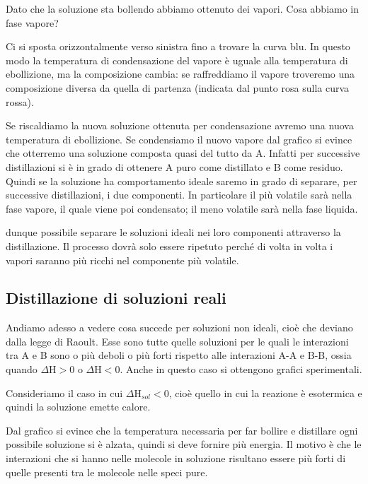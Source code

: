 Dato che la soluzione sta bollendo abbiamo ottenuto dei vapori. Cosa abbiamo in fase vapore?

Ci si sposta orizzontalmente verso sinistra fino a trovare la curva blu. In questo modo la temperatura di condensazione del vapore è uguale alla temperatura di ebollizione, ma la composizione cambia: se raffreddiamo il vapore troveremo una composizione diversa da quella di partenza (indicata dal punto rosa sulla curva rossa).

Se riscaldiamo la nuova soluzione ottenuta per condensazione avremo una nuova temperatura di ebollizione. Se condensiamo il nuovo vapore dal grafico si evince che otterremo una soluzione composta quasi del tutto da A. Infatti per successive distillazioni si è in grado di ottenere A puro come distillato e B come residuo. Quindi se la soluzione ha comportamento ideale saremo in grado di separare, per successive distillazioni, i due componenti. In particolare il più volatile sarà nella fase vapore, il quale viene poi condensato; il meno volatile sarà nella fase liquida.

\E dunque possibile separare le soluzioni ideali nei loro componenti attraverso la distillazione. Il processo dovrà solo essere ripetuto perché di volta in volta i vapori saranno più ricchi nel componente più volatile.
\subsection{Distillazione di soluzioni reali}
Andiamo adesso a vedere cosa succede per soluzioni non ideali, cioè che deviano dalla legge di Raoult. Esse sono tutte quelle soluzioni per le quali le interazioni tra A e B sono o più deboli o più forti rispetto alle interazioni A-A e B-B, ossia quando $\Delta$H$>$0 o $\Delta$H$<$0. Anche in questo caso si ottengono grafici sperimentali.

\vspace{0.2cm}Consideriamo il caso in cui $\Delta$H$_{sol}$$<$0, cioè quello in cui la reazione è esotermica e quindi la soluzione emette calore.

Dal grafico si evince che la temperatura necessaria per far bollire e distillare ogni possibile soluzione si è alzata, quindi si deve fornire più energia. Il motivo è che le interazioni che si hanno nelle molecole in soluzione risultano essere più forti di quelle presenti tra le molecole nelle speci pure.

